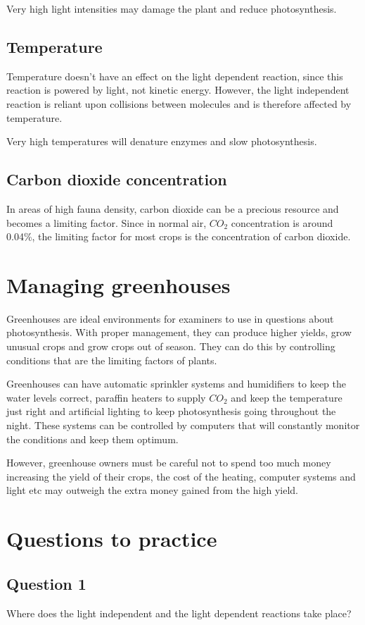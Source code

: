 \documentclass{article}
\begin{document}
Very high light intensities may damage the plant and reduce photosynthesis.

\subsection*{Temperature}
Temperature doesn't have an effect on the light dependent reaction, since this reaction is powered by light, not kinetic energy. However, the light independent reaction is reliant upon collisions between molecules and is therefore affected by temperature.

Very high temperatures will denature enzymes and slow photosynthesis.

\subsection*{Carbon dioxide concentration}
In areas of high fauna density, carbon dioxide can be a precious resource and becomes a limiting factor. Since in normal air, $CO_2$ concentration is around 0.04\%, the limiting factor for most crops is the concentration of carbon dioxide.


\section*{Managing greenhouses}
Greenhouses are ideal environments for examiners to use in questions about photosynthesis. With proper management, they can produce higher yields, grow unusual crops and grow crops out of season. They can do this by controlling conditions that are the limiting factors of plants.

Greenhouses can have automatic sprinkler systems and humidifiers to keep the water levels correct, paraffin heaters to supply $CO_2$ and keep the temperature just right and artificial lighting to keep photosynthesis going throughout the night. These systems can be controlled by computers that will constantly monitor the conditions and keep them optimum.

However, greenhouse owners must be careful not to spend too much money increasing the yield of their crops, the cost of the heating, computer systems and light etc may outweigh the extra money gained from the high yield.


\section*{Questions to practice}
\subsection*{Question 1}
Where does the light independent and the light dependent reactions take place?
\end{document}
